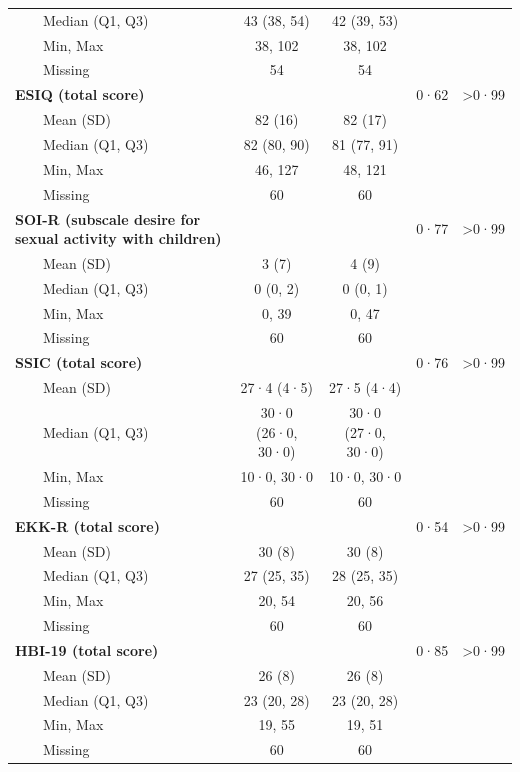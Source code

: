 \documentclass[
  super,
  preprint,
  1p,
  onecolumn]{elsarticle}
\begin{document}
\begin{table}
{\begin{tabular*}{\linewidth}{@{\extracolsep{\fill}}lcccc}
    Median (Q1, Q3) & 43 (38, 54) & 42 (39, 53) &  &  \\ 
    Min, Max & 38, 102 & 38, 102 &  &  \\ 
    Missing & 54 & 54 &  &  \\ 
{\bfseries ESIQ (total score)} &  &  & 0·62 & >0·99 \\ 
    Mean (SD) & 82 (16) & 82 (17) &  &  \\ 
    Median (Q1, Q3) & 82 (80, 90) & 81 (77, 91) &  &  \\ 
    Min, Max & 46, 127 & 48, 121 &  &  \\ 
    Missing & 60 & 60 &  &  \\ 
{\bfseries SOI-R (subscale desire for sexual activity with children)} &  &  & 0·77 & >0·99 \\ 
    Mean (SD) & 3 (7) & 4 (9) &  &  \\ 
    Median (Q1, Q3) & 0 (0, 2) & 0 (0, 1) &  &  \\ 
    Min, Max & 0, 39 & 0, 47 &  &  \\ 
    Missing & 60 & 60 &  &  \\ 
{\bfseries SSIC (total score)} &  &  & 0·76 & >0·99 \\ 
    Mean (SD) & 27·4 (4·5) & 27·5 (4·4) &  &  \\ 
    Median (Q1, Q3) & 30·0 (26·0, 30·0) & 30·0 (27·0, 30·0) &  &  \\ 
    Min, Max & 10·0, 30·0 & 10·0, 30·0 &  &  \\ 
    Missing & 60 & 60 &  &  \\ 
{\bfseries EKK-R (total score)} &  &  & 0·54 & >0·99 \\ 
    Mean (SD) & 30 (8) & 30 (8) &  &  \\ 
    Median (Q1, Q3) & 27 (25, 35) & 28 (25, 35) &  &  \\ 
    Min, Max & 20, 54 & 20, 56 &  &  \\ 
    Missing & 60 & 60 &  &  \\ 
{\bfseries HBI-19 (total score)} &  &  & 0·85 & >0·99 \\ 
    Mean (SD) & 26 (8) & 26 (8) &  &  \\ 
    Median (Q1, Q3) & 23 (20, 28) & 23 (20, 28) &  &  \\ 
    Min, Max & 19, 55 & 19, 51 &  &  \\ 
    Missing & 60 & 60 &  &  \\ 
\bottomrule
\end{tabular*}
\begin{minipage}{\linewidth}
\vspace{.05em}

\end{minipage}}
\end{table}
\end{document}
